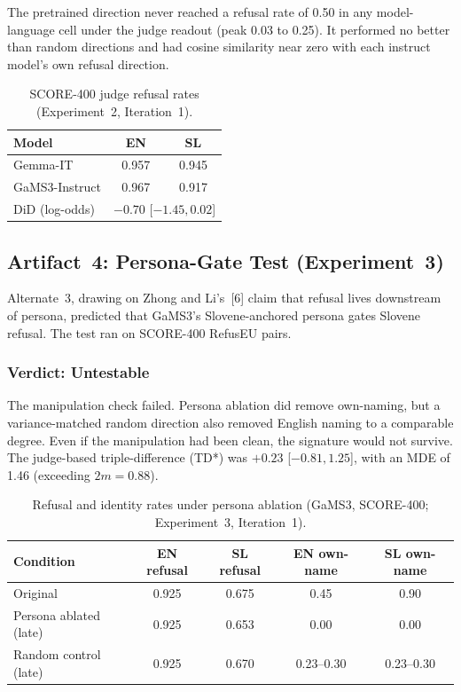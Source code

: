 \documentclass[11pt,letterpaper]{article}
\begin{document}
The pretrained direction never reached a refusal rate of 0.50 in any model-language cell under the judge readout (peak 0.03 to 0.25). It performed no better than random directions and had cosine similarity near zero with each instruct model's own refusal direction.

\begin{table}[!htbp]
\centering
\caption{SCORE-400 judge refusal rates (Experiment~2, Iteration~1).}
\label{tab:score400_exp2}
\begin{tabular}{lcc}
\toprule
Model & EN & SL \\
\midrule
Gemma-IT & 0.957 & 0.945 \\
GaMS3-Instruct & 0.967 & 0.917 \\
DiD (log-odds) & \multicolumn{2}{c}{$-0.70$ [$-1.45, 0.02$]} \\
\bottomrule
\end{tabular}
\end{table}


\subsection{Artifact~4: Persona-Gate Test (Experiment~3)}
\label{gen_art_experiment_3}

Alternate~3, drawing on Zhong and Li's~[6] claim that refusal lives downstream of persona, predicted that GaMS3's Slovene-anchored persona gates Slovene refusal. The test ran on SCORE-400 RefusEU pairs.

\subsubsection{Verdict: Untestable}

The manipulation check failed. Persona ablation did remove own-naming, but a variance-matched random direction also removed English naming to a comparable degree. Even if the manipulation had been clean, the signature would not survive. The judge-based triple-difference (TD*) was $+0.23$ [$-0.81, 1.25$], with an MDE of 1.46 (exceeding $2m = 0.88$).

\begin{table}[!htbp]
\centering
\caption{Refusal and identity rates under persona ablation (GaMS3, SCORE-400; Experiment~3, Iteration~1).}
\label{tab:persona_exp3}
\begin{tabular}{lcccc}
\toprule
Condition & EN refusal & SL refusal & EN own-name & SL own-name \\
\midrule
Original & 0.925 & 0.675 & 0.45 & 0.90 \\
Persona ablated (late) & 0.925 & 0.653 & 0.00 & 0.00 \\
Random control (late) & 0.925 & 0.670 & 0.23--0.30 & 0.23--0.30 \\
\bottomrule
\end{tabular}
\end{table}
\end{document}
